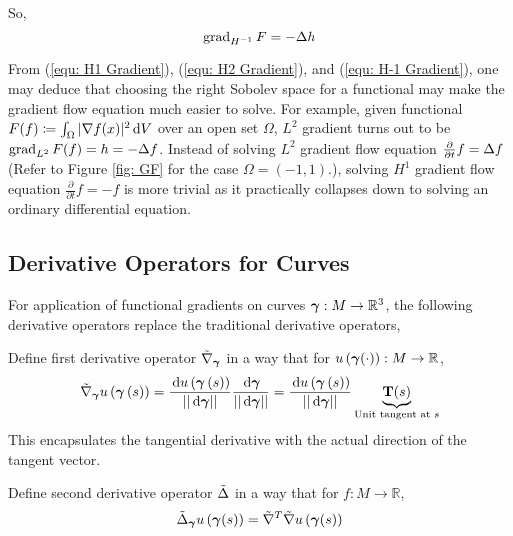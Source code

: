 \documentclass[../dissertation.tex]{subfiles}
\begin{document}
So,
\begin{equation}
    \operatorname{grad}_{H^{-1}} F = -\Delta h
    \label{equ: H-1 Gradient}
\end{equation}
\begin{remark}
    From (\ref{equ: H1 Gradient}), (\ref{equ: H2 Gradient}), and (\ref{equ: H-1 Gradient}), one may deduce that
    choosing the right Sobolev space for a functional may make the gradient flow equation much easier to solve.
    For example, given functional $F (f) \coloneqq \int_{\Omega} |\nabla f (x)|^2 \, \text{d} V$ over an open set $\Omega$,
    $L^2$ gradient turns out to be $\operatorname{grad}_{L^2} F (f) = h = -\Delta f$. 
    Instead of solving $L^2$ gradient flow equation $\frac{\partial}{\partial t} f = \Delta f$ (Refer to Figure \ref{fig: GF} for the case $\Omega = (-1, 1)$.),
    solving $H^1$ gradient flow equation $\frac{\partial}{\partial t}f = -f$ is more trivial
    as it practically collapses down to solving an ordinary differential equation.
\end{remark}

\subsection{Derivative Operators for Curves}
For application of functional gradients on curves $\boldsymbol{\gamma}: M \rightarrow \mathbb{R}^3$,
the following derivative operators replace the traditional derivative operators,
\begin{definition}
    Define first derivative operator\cite{YSC2021} $\tilde{\nabla}_{\boldsymbol{\gamma}}$ in a way that for $u \left( \boldsymbol{\gamma} (\cdot) \right): M \rightarrow \mathbb{R}$,
    \begin{equation}
        \tilde{\nabla}_{\boldsymbol{\gamma}} u \left( \boldsymbol{\gamma} \left( s \right) \right)
        = \frac{\, \text{d} u \left( \boldsymbol{\gamma} \left( s \right) \right)}{\lvert \lvert \, \text{d} \boldsymbol{\gamma} \rvert \rvert} \frac{\, \text{d} \boldsymbol{\gamma}}{\lvert \lvert \, \text{d} \boldsymbol{\gamma} \rvert \rvert}
        = \frac{\, \text{d} u \left( \boldsymbol{\gamma} \left( s \right) \right)}{\lvert \lvert \, \text{d} \boldsymbol{\gamma} \rvert \rvert} \underbrace{\mathbf{T}(s)}_{\text{Unit tangent at } s}
        \label{equ: Curve Gradient Operator}
    \end{equation}
    This encapsulates the tangential derivative with the actual direction of the tangent vector.
\end{definition}

\begin{definition}
    Define second derivative operator $\tilde{\Delta}$ in a way that for $f: M \rightarrow \mathbb{R}$,
    \begin{equation}
        \tilde{\Delta}_{\boldsymbol{\gamma}} u \left( \boldsymbol{\gamma} (s) \right) = \tilde{\nabla}^{T} \tilde{\nabla} u \left( \boldsymbol{\gamma} (s) \right)
    \end{equation}
\end{definition}
\end{document}
